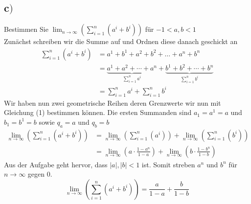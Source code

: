 \documentclass[18pt,a4paper]{article}
\begin{document}
\subsection*{c$)$}
Bestimmen Sie $\displaystyle \lim_{n \to \infty}\left(\sum_{i=1}^{n}\left(a^i + b^i\right)\right) $ f\"ur $-1 < a,b < 1$\\[5pt]
Zun\"achst schreiben wir die Summe auf und Ordnen diese danach geschickt an
\begin{align*}
\displaystyle \sum_{i=1}^{n}\left(a^i + b^i\right) &= a^1 + b^1 + a^2 +b^2 + \dots + a^n + b^n\\[5pt]
&= \underbrace{a^1+a^2+\cdots + a^n}_\text{$\displaystyle \sum_{i=1}^{n}a^i$}+  \underbrace{b^1+b^2+\cdots + b^n}_\text{$\displaystyle \sum_{i=1}^{n}b^i $}\\[5pt]
&= \sum_{i=1}^{n}a^i + \sum_{i=1}^{n}b^i 
\end{align*}
Wir haben nun zwei geometrische Reihen deren Grenzwerte wir nun mit Gleichung (1) bestimmen k\"onnen. Die ersten Summanden sind $a_1 = a^1 = a$ und $b_1 = b^1 = b$ sowie $q_a = a$ und $q_b = b$
\begin{align*}
\displaystyle \lim_{n \to \infty}\left(\sum_{i=1}^{n}\left(a^i + b^i\right)\right) &= \lim_{n \to \infty}\left(\sum_{i=1}^{n}\left(a^i \right)\right) + \lim_{n \to \infty}\left(\sum_{i=1}^{n}\left(b^i\right)\right)\\
&=\lim_{n \to \infty} \left(a \cdot \frac{1-a^n}{1-a} \right) + \lim_{n \to \infty} \left(b \cdot \frac{1-b^n}{1-b} \right)
\end{align*}
Aus der Aufgabe geht hervor, dass $\vert a \vert,\vert b \vert < 1 $ ist. Somit streben $a^n$ und $b^n$ f\"ur $n \to \infty$ gegen 0.
\begin{equation*}
\displaystyle \lim_{n \to \infty}\left(\sum_{i=1}^{n}\left(a^i + b^i\right)\right) = \frac{a}{1-a} + \frac{b}{1-b}
\end{equation*}
\end{document}
